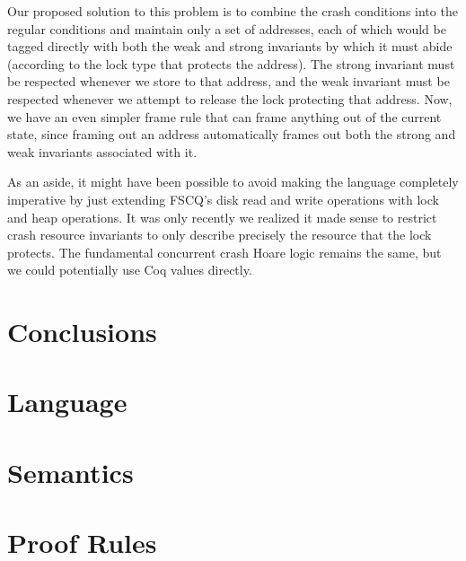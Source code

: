 Our proposed solution to this problem is to combine the crash conditions into
the regular conditions and maintain only a set of addresses, each of which
would be tagged directly with both the weak and strong invariants by which it
must abide (according to the lock type that protects the address).
The strong
invariant must be respected whenever we store
to that address, and the weak invariant must be respected whenever we attempt to
release the lock protecting that address.
Now, we have an even simpler frame
rule that can frame anything out of the current state, since framing out an
address automatically frames out both the strong and weak invariants associated
with it.

As an aside, it might have been possible to avoid making the language completely
imperative by just extending FSCQ's disk read and write operations with lock and
heap operations.
It was only recently we realized it made sense to restrict
crash resource invariants to only describe precisely the resource that the lock
protects.
The fundamental concurrent crash Hoare logic remains the same, but we
could potentially use Coq values directly.

\section{Conclusions}

\appendix
\section{Language}
\section{Semantics}
\section{Proof Rules}
